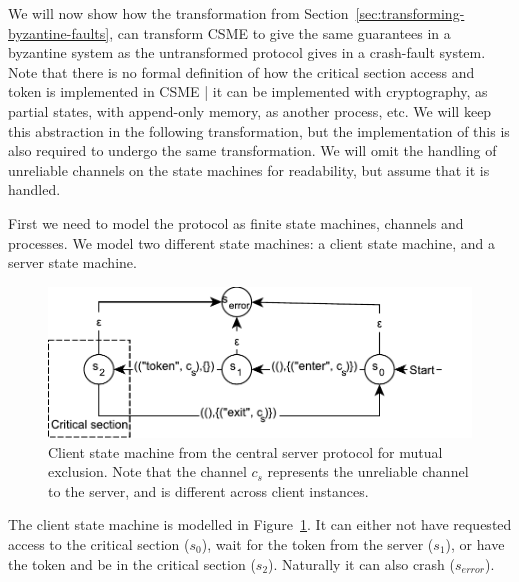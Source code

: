 \documentclass{article}
\begin{document}
		We will now show how the transformation from Section~\ref{sec:transforming-byzantine-faults}, can transform CSME to give the same guarantees in a byzantine system as the untransformed protocol gives in a crash-fault system.
		Note that there is no formal definition of how the critical section access and token is implemented in CSME | it can be implemented with cryptography, as partial states, with append-only memory, as another process, etc.
		We will keep this abstraction in the following transformation, but the implementation of this is also required to undergo the same transformation.
		We will omit the handling of unreliable channels on the state machines for readability, but assume that it is handled.

		First we need to model the protocol as finite state machines, channels and processes.
		We model two different state machines: a client state machine, and a server state machine.

		\FloatBarrier
		\begin{figure}[ht!]
			\center
			\includegraphics[scale=0.6]{figures/state-machines/CSME-client-NFA.pdf}
			\caption{Client state machine from the central server protocol for mutual exclusion. Note that the channel $c_s$ represents the unreliable channel to the server, and is different across client instances.}
			\label{fig:CSME-client-NFA}
		\end{figure}
		\FloatBarrier

		The client state machine is modelled in Figure~\ref{fig:CSME-client-NFA}.
		It can either not have requested access to the critical section ($s_0$), wait for the token from the server ($s_1$), or have the token and be in the critical section ($s_2$).
		Naturally it can also crash ($s_{error}$).
\end{document}
